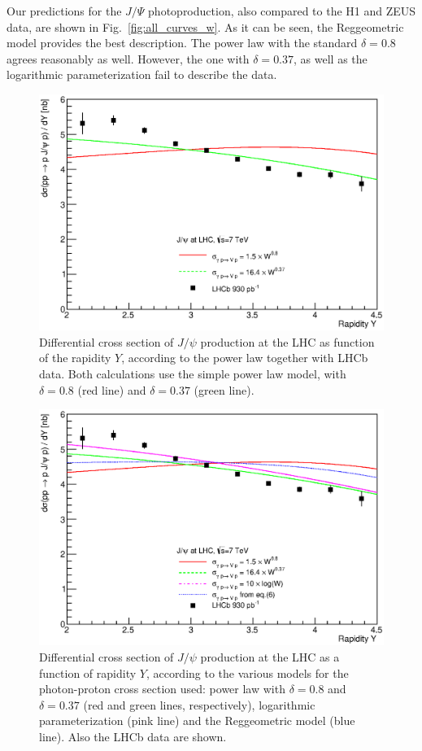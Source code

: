 \documentclass[12pt]{article}
\begin{document}
Our predictions for the $J/\Psi$ photoproduction, also compared to the H1 and ZEUS data, are shown in Fig.~\ref{fig:all_curves_w}.
As it can be seen, the Reggeometric model provides the best description.
The power law with the standard $\delta=0.8$ agrees reasonably as well.
However, the one with $\delta=0.37$, as well as the logarithmic parameterization fail to describe the data.

\begin{figure}[!h]
\centering
 \includegraphics[width=.8\textwidth]{figures/dSigma_dy_powerlaw_vs_powerlaw.eps}
 \caption{Differential cross section of $J/\psi$ production at the LHC as function of the rapidity $Y$, according to the power law  together with LHCb data.
          Both calculations use the simple power law model, with $\delta=0.8$ (red line) and $\delta=0.37$ (green line).}
 \label{fig:delta_fit}
\end{figure}

\begin{figure}[p]
\centering
 \includegraphics[width=.8\textwidth]{figures/dSigma_dy_all_theory.eps}
 \caption{Differential cross section of $J/\psi$ production at the LHC as a function of rapidity $Y$, according to the various models for the photon-proton cross section used: power law with $\delta=0.8$ and $\delta=0.37$ (red and green lines, respectively), logarithmic parameterization (pink line) and the Reggeometric model (blue line). Also the LHCb data are shown.}
  \label{fig:all_curves}
\end{figure}
\end{document}
